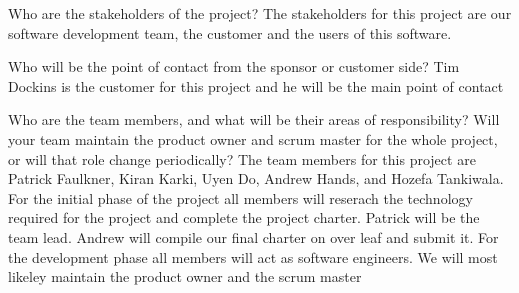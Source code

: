 Who are the stakeholders of the project? 
The stakeholders for this project are our software development team, the customer and the users of this software.

Who will be the point of contact from the sponsor or customer side? 
Tim Dockins is the customer for this project and he will be the main point of contact

Who are the team members, and what will be their areas of responsibility? Will your team maintain the product owner and scrum master for the whole project, or will that role change periodically?
The team members for this project are Patrick Faulkner, Kiran Karki, Uyen Do, Andrew Hands, and Hozefa Tankiwala. 
For the initial phase of the project all members will reserach the technology required for the project and complete the project charter.
Patrick will be the team lead. Andrew will compile our final charter on over leaf and submit it. 
For the development phase all members will act as software engineers.
We will most likeley maintain the product owner and the scrum master


